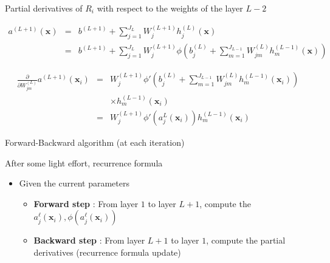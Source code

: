 \documentclass[ignorenonframetext,]{beamer}
\providecommand{\tightlist}{%
  \setlength{\itemsep}{0pt}\setlength{\parskip}{0pt}}
\begin{document}
\begin{frame}{Partial derivatives of \(R_i\) with respect to the weights
of the layer \(L-2\)}
\protect\hypertarget{partial-derivatives-of-r_i-with-respect-to-the-weights-of-the-layer-l-2}{}

\begin{eqnarray*}
a^{(L+1)}(\mathbf{x}) &=&  b^{(L+1)} + \sum_{j=1}^{J_L} W^{(L+1)}_j h_j^{(L)}(\mathbf{x}) \\
&=&  b^{(L+1)} + \sum_{j=1}^{J_L}  W^{(L+1)}_j \phi \left(b_j^{(L)} + \sum_{m=1}^{J_{L-1}} W^{(L)}_{jm} h_m^{(L-1)}(\mathbf{x})\right)
\end{eqnarray*}

\begin{eqnarray*}
\frac{\partial}{\partial W^{(L)}_{jm}}  a^{(L+1)}(\mathbf{x}_i)  &=&   W^{(L+1)}_j \phi' \left(b_j^{(L)} + \sum_{m=1}^{J_{L-1}} W^{(L)}_{jm} h_m^{(L-1)}(\mathbf{x}_i)\right) \\
&& \times h_m^{(L-1)}(\mathbf{x}_i)   \\
&=& W^{(L+1)}_j \phi'(a_j^{L}(\mathbf{x}_i)) h_m^{(L-1)}(\mathbf{x}_i)
\end{eqnarray*}

\end{frame}

\begin{frame}{Forward-Backward algorithm (at each iteration)}
\protect\hypertarget{forward-backward-algorithm-at-each-iteration}{}

After some light effort, recurrence formula

\begin{itemize}
\tightlist
\item
  Given the current parameters

  \begin{itemize}
  \tightlist
  \item
    \textbf{Forward step} : From layer \(1\) to layer \(L+1\), compute
    the \(a_j^{\ell}(\mathbf{x}_i),\phi(a_j^{\ell}(\mathbf{x}_i))\)\\
  \item
    \textbf{Backward step } : From layer \(L+1\) to layer \(1\), compute
    the partial derivatives (recurrence formula update)
  \end{itemize}
\end{itemize}

\end{frame}
\end{document}
